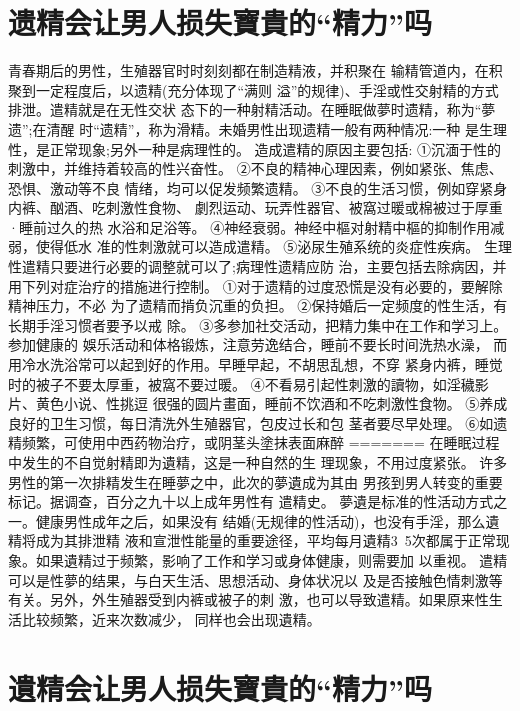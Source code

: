 \documentclass[12pt,UTF8]{ctexbook}
\begin{document}
\section{遗精会让男人损失寶貴的“精力”吗}

青春期后的男性，生殖器官时时刻刻都在制造精液，并积聚在
输精管道内，在积聚到一定程度后，以遗精(充分体现了“满则
溢”的规律)、手淫或性交射精的方式排泄。遣精就是在无性交状
态下的一种射精活动。在睡眠做夢时遗精，称为“夢遗”;在清醒
时“遗精”，称为滑精。未婚男性出现遗精一般有两种情况:一种
是生理性，是正常现象;另外一种是病理性的。
造成遣精的原因主要包括:
①沉湎于性的刺激中，并维持着较高的性兴奋性。
②不良的精神心理因素，例如紧张、焦虑、恐惧、激动等不良
情绪，均可以促发频繁遗精。
③不良的生活习惯，例如穿紧身内裤、酗酒、吃刺激性食物、
劇烈运动、玩弄性器官、被窩过暖或棉被过于厚重·睡前过久的热
水浴和足浴等。
④神经衰弱。神经中樞对射精中樞的抑制作用减弱，使得低水
准的性刺激就可以造成遣精。
⑤泌尿生殖系统的炎症性疾病。
生理性遣精只要进行必要的调整就可以了;病理性遗精应防
治，主要包括去除病因，并用下列对症治疗的措施进行控制。
①对于遗精的过度恐慌是没有必要的，要解除精神压力，不必
为了遗精而掯负沉重的负担。
②保持婚后一定频度的性生活，有长期手淫习惯者要予以戒
除。
③多参加社交活动，把精力集中在工作和学习上。参加健康的
娛乐活动和体格锻炼，注意劳逸结合，睡前不要长时间洗热水澡，
而用冷水洗浴常可以起到好的作用。早睡早起，不胡思乱想，不穿
紧身内裤，睡觉时的被子不要太厚重，被窩不要过暖。
④不看易引起性刺激的讀物，如淫穢影片、黄色小说、性挑逗
很强的圆片畫面，睡前不饮酒和不吃刺激性食物。
⑤养成良好的卫生习惯，每日清洗外生殖器官，包皮过长和包
茎者要尽早处理。
⑥如遗精频繁，可使用中西药物治疗，或阴茎头塗抹表面麻醉
=======
在睡眠过程中发生的不自觉射精即为遺精，这是一种自然的生
理现象，不用过度紧张。
许多男性的第一次排精发生在睡夢之中，此次的夢遺成为其由
男孩到男人转变的重要标记。据调查，百分之九十以上成年男性有
遣精史。
夢遺是标准的性活动方式之一。健康男性成年之后，如果没有
结婚(无规律的性活动)，也没有手淫，那么遺精将成为其排泄精
液和宣泄性能量的重要途径，平均每月遺精3~5次都属于正常现
象。如果遺精过于频繁，影响了工作和学习或身体健康，则需要加
以重视。
遣精可以是性夢的结果，与白天生活、思想活动、身体状况以
及是否接触色情刺激等有关。另外，外生殖器受到内裤或被子的刺
激，也可以导致遣精。如果原来性生活比较频繁，近来次数减少，
同样也会出现遺精。

\section{遺精会让男人损失寶貴的“精力”吗}
\end{document}
